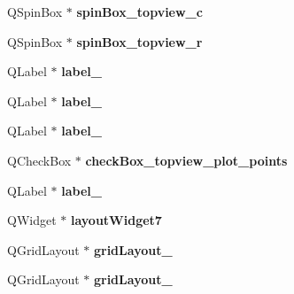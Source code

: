 \begin{DoxyCompactItemize}
\item 
\hypertarget{class_ui___main_window_a8110ede36f3bb3b9940f23c99ed25ce0}{}Q\+Spin\+Box $\ast$ {\bfseries spin\+Box\+\_\+topview\+\_\+c}\label{class_ui___main_window_a8110ede36f3bb3b9940f23c99ed25ce0}

\item 
\hypertarget{class_ui___main_window_ab433b6488e9c02ce6e08480ab94d1e36}{}Q\+Spin\+Box $\ast$ {\bfseries spin\+Box\+\_\+topview\+\_\+r}\label{class_ui___main_window_ab433b6488e9c02ce6e08480ab94d1e36}

\item 
\hypertarget{class_ui___main_window_a1bf8f5e6531b7bc79378d58ee57ba389}{}Q\+Label $\ast$ {\bfseries label\+\_}\label{class_ui___main_window_a1bf8f5e6531b7bc79378d58ee57ba389}

\item 
\hypertarget{class_ui___main_window_acf6fc9bce4db154fecbd1ff532918353}{}Q\+Label $\ast$ {\bfseries label\+\_}\label{class_ui___main_window_acf6fc9bce4db154fecbd1ff532918353}

\item 
\hypertarget{class_ui___main_window_a31fc1e3e6c2d61c1dc50e96b6a60344d}{}Q\+Label $\ast$ {\bfseries label\+\_}\label{class_ui___main_window_a31fc1e3e6c2d61c1dc50e96b6a60344d}

\item 
\hypertarget{class_ui___main_window_a33dd6998309a6bf6037295e3d07f2371}{}Q\+Check\+Box $\ast$ {\bfseries check\+Box\+\_\+topview\+\_\+plot\+\_\+points}\label{class_ui___main_window_a33dd6998309a6bf6037295e3d07f2371}

\item 
\hypertarget{class_ui___main_window_ac6c19d112b25073d9276c377d00dbadb}{}Q\+Label $\ast$ {\bfseries label\+\_}\label{class_ui___main_window_ac6c19d112b25073d9276c377d00dbadb}

\item 
\hypertarget{class_ui___main_window_adae4a47910c32af51c19161423e88618}{}Q\+Widget $\ast$ {\bfseries layout\+Widget7}\label{class_ui___main_window_adae4a47910c32af51c19161423e88618}

\item 
\hypertarget{class_ui___main_window_a2bb984d720e889f05d38dac3cf7949c9}{}Q\+Grid\+Layout $\ast$ {\bfseries grid\+Layout\+\_}\label{class_ui___main_window_a2bb984d720e889f05d38dac3cf7949c9}

\item 
\hypertarget{class_ui___main_window_a4c2d544352d423a361b8ab2e1d5636ec}{}Q\+Grid\+Layout $\ast$ {\bfseries grid\+Layout\+\_}\label{class_ui___main_window_a4c2d544352d423a361b8ab2e1d5636ec}


\end{DoxyCompactItemize}
